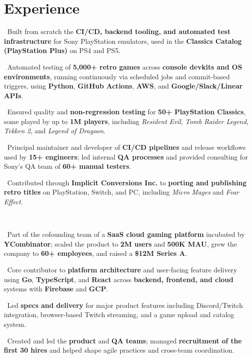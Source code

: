 \documentclass{muratcan_cv}
\newcommand{\tightbullet}[1]{\coloredbullet\ #1\par}
\renewcommand{\explanationdetail}[1]{%
    \indent \indent \begin{minipage}{0.87\linewidth} \fontsize{8.35pt}{9.7pt}\selectfont #1 \end{minipage} \\[0.03cm]
}
\begin{document}
\section{Experience}
\explanationdetail{
    \tightbullet{Built from scratch the \textbf{CI/CD, backend tooling, and automated test infrastructure} for Sony PlayStation emulators, used in the \textbf{Classics Catalog (PlayStation Plus)} on PS4 and PS5.}
    \tightbullet{Automated testing of \textbf{5,000+ retro games} across \textbf{console devkits and OS environments}, running continuously via scheduled jobs and commit-based triggers, using \textbf{Python}, \textbf{GitHub Actions}, \textbf{AWS}, and \textbf{Google/Slack/Linear APIs}.}
    \tightbullet{Ensured quality and \textbf{non-regression testing} for \textbf{50+ PlayStation Classics}, some played by up to \textbf{1M players}, including \textit{Resident Evil}, \textit{Tomb Raider Legend}, \textit{Tekken 2}, and \textit{Legend of Dragoon}.}
    \tightbullet{Principal maintainer and developer of \textbf{CI/CD pipelines} and release workflows used by \textbf{15+ engineers}; led internal \textbf{QA processes} and provided consulting for Sony's QA team of \textbf{60+ manual testers}.}
    \tightbullet{Contributed through \textbf{Implicit Conversions Inc.} to \textbf{porting and publishing retro titles} on PlayStation, Switch, and PC, including \textit{Micro Mages} and \textit{Fear Effect}.}
}

\explanationdetail{
    \tightbullet{Part of the cofounding team of a \textbf{SaaS cloud gaming platform} incubated by \textbf{YCombinator}; scaled the product to \textbf{2M users} and \textbf{500K MAU}, grew the company to \textbf{60+ employees}, and raised a \textbf{\$12M Series A}.}
    \tightbullet{Core contributor to \textbf{platform architecture} and user-facing feature delivery using \textbf{Go}, \textbf{TypeScript}, and \textbf{React} across \textbf{backend, frontend, and cloud} systems with \textbf{Firebase} and \textbf{GCP}.}
    \tightbullet{Led \textbf{specs and delivery} for major product features including Discord/Twitch integration, browser-based Twitch streaming, and a game upload and catalog system.}
    \tightbullet{Created and led the \textbf{product} and \textbf{QA teams}; managed \textbf{recruitment of the first 30 hires} and helped shape agile practices and cross-team coordination.}
}
\end{document}
